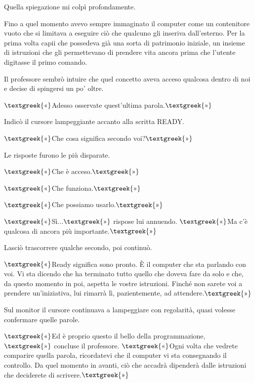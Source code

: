 \documentclass{article}
\begin{document}
Quella spiegazione mi colpì profondamente.

Fino a quel momento avevo sempre immaginato il computer come un contenitore vuoto che si limitava a eseguire ciò che
qualcuno gli inseriva dall'esterno. Per la prima volta capii che possedeva già una sorta di patrimonio iniziale, un
insieme di istruzioni che gli permettevano di prendere vita ancora prima che l'utente digitasse il primo comando.

Il professore sembrò intuire che quel concetto aveva acceso qualcosa dentro di noi e decise di spingersi un po' oltre.

$\text{\textgreek{«}}$Adesso osservate quest'ultima parola.$\text{\textgreek{»}}$

Indicò il cursore lampeggiante accanto alla scritta READY.

$\text{\textgreek{«}}$Che cosa significa secondo voi?$\text{\textgreek{»}}$

Le risposte furono le più disparate.

$\text{\textgreek{«}}$Che è acceso.$\text{\textgreek{»}}$

$\text{\textgreek{«}}$Che funziona.$\text{\textgreek{»}}$

$\text{\textgreek{«}}$Che possiamo usarlo.$\text{\textgreek{»}}$

$\text{\textgreek{«}}$Sì...$\text{\textgreek{»}}$ rispose lui annuendo. $\text{\textgreek{«}}$Ma c'è qualcosa di ancora
più importante.$\text{\textgreek{»}}$

Lasciò trascorrere qualche secondo, poi continuò.

$\text{\textgreek{«}}$Ready significa {\textquotedbl}sono pronto{\textquotedbl}. È il computer che sta parlando con voi.
Vi sta dicendo che ha terminato tutto quello che doveva fare da solo e che, da questo momento in poi, aspetta le vostre
istruzioni. Finché non sarete voi a prendere un'iniziativa, lui rimarrà lì, pazientemente, ad
attendere.$\text{\textgreek{»}}$

Sul monitor il cursore continuava a lampeggiare con regolarità, quasi volesse confermare quelle parole.

$\text{\textgreek{«}}$Ed è proprio questo il bello della programmazione,$\text{\textgreek{»}}$ concluse il professore.
$\text{\textgreek{«}}$Ogni volta che vedrete comparire quella parola, ricordatevi che il computer vi sta consegnando il
controllo. Da quel momento in avanti, ciò che accadrà dipenderà dalle istruzioni che deciderete di
scrivere.$\text{\textgreek{»}}$
\end{document}
